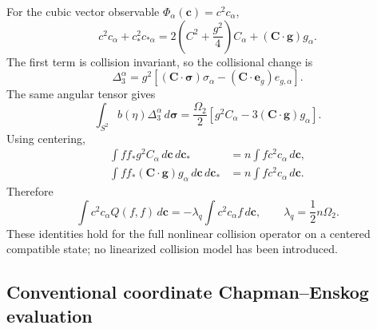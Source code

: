 \documentclass[11pt,oneside]{article}
\numberwithin{equation}{section}
\theoremstyle{definition}
\begin{document}
For the cubic vector observable $\Phi_\alpha(\bm c)=c^2c_\alpha$,
\begin{equation}
c^2c_\alpha+c_*^2c_{*\alpha}
=
2\left(C^2+\frac{g^2}{4}\right)C_\alpha
+
(\bm C\cdot\bm g)g_\alpha.
\end{equation}
The first term is collision invariant, so the collisional change is
\begin{equation}
\Delta_3^\alpha
=
g^2\left[
(\bm C\cdot\bm\sigma)\sigma_\alpha
-
(\bm C\cdot\bm e_g)e_{g,\alpha}
\right].
\end{equation}
The same angular tensor gives
\begin{equation}
\int_{S^2}b(\eta)\Delta_3^\alpha\,d\bm\sigma
=
\frac{\Omega_2}{2}
\left[
g^2C_\alpha
-3(\bm C\cdot\bm g)g_\alpha
\right].
\end{equation}
Using centering,
\begin{align}
\int ff_*g^2C_\alpha\,d\bm c\,d\bm c_*
&=
n\int f c^2c_\alpha\,d\bm c,
\\
\int ff_*(\bm C\cdot\bm g)g_\alpha\,d\bm c\,d\bm c_*
&=
n\int f c^2c_\alpha\,d\bm c.
\end{align}
Therefore
\begin{equation}
\int c^2c_\alpha Q(f,f)\,d\bm c
=
-\lambda_q\int c^2c_\alpha f\,d\bm c,
\qquad
\lambda_q=\frac12n\Omega_2.
\label{eq:app_maxwell_lambda_q}
\end{equation}
These identities hold for the full nonlinear collision operator on a centered compatible state; no linearized collision model has been introduced.

\subsection{Conventional coordinate Chapman--Enskog evaluation}
\end{document}
